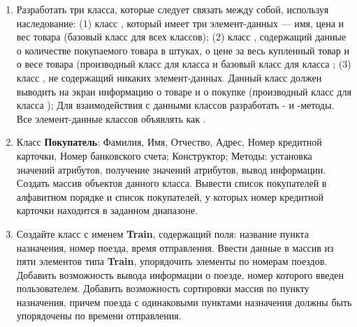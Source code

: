 \begin{enumerate}[leftmargin=*]
    \item Разработать три класса, которые следует связать между собой, используя наследование: (1) класс , который имеет три элемент-данных — имя, цена и вес товара (базовый класс для всех классов); (2) класс  , содержащий данные о количестве покупаемого товара в штуках, о цене за весь купленный товар и  о весе товара (производный класс для класса  и базовый класс для класса ; (3) класс , не содержащий никаких элемент-данных. Данный класс должен выводить на экран информацию о товаре и о покупке (производный класс для класса ); Для взаимодействия с данными классов разработать - и -методы. Все элемент-данные классов объявлять как .
    \item Класс \textbf{Покупатель}: Фамилия, Имя, Отчество, Адрес, Номер кредитной карточки, Номер банковского счета; Конструктор; Методы: установка значений атрибутов, получение значений атрибутов, вывод информации. Создать массив объектов данного класса. Вывести список покупателей в алфавитном порядке и список покупателей, у которых номер кредитной карточки находится в заданном диапазоне.
    \item Создайте класс с именем \textbf{Train}, содержащий поля: название пункта назначения, номер поезда, время отправления. Ввести данные в массив из пяти элементов типа \textbf{Train}, упорядочить элементы по номерам поездов. Добавить возможность вывода информации о поезде, номер которого введен пользователем. Добавить возможность сортировки массив по пункту назначения, причем поезда с одинаковыми пунктами назначения должны быть упорядочены по времени отправления. 
\end{enumerate}

